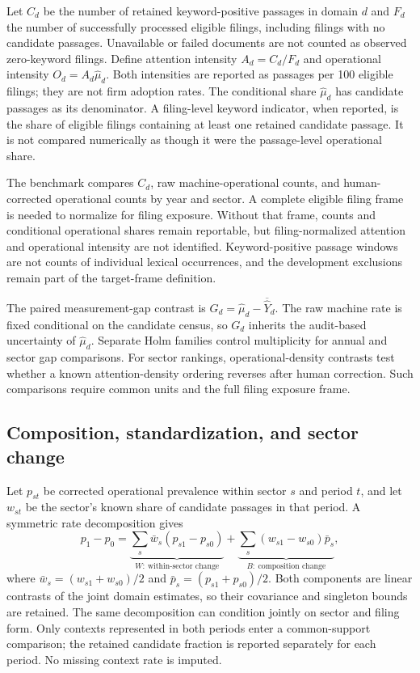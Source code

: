 \documentclass[12pt]{article}
\begin{document}
Let $C_d$ be the number of retained keyword-positive passages in domain $d$
and $F_d$ the number of successfully processed eligible filings, including
filings with no candidate passages. Unavailable or failed documents are not
counted as observed zero-keyword filings. Define attention intensity $A_d=C_d/F_d$ and operational intensity
$O_d=A_d\widehat\mu_d$. Both intensities are reported as passages per 100
eligible filings; they are not firm adoption rates. The conditional share
$\widehat\mu_d$ has candidate passages as its denominator. A filing-level
keyword indicator, when reported, is the share of eligible filings containing
at least one retained candidate passage. It is not compared numerically as
though it were the passage-level operational share.

The benchmark compares $C_d$, raw machine-operational counts, and
human-corrected operational counts by year and sector. A complete eligible
filing frame is needed to normalize for filing exposure. Without that frame,
counts and conditional operational shares remain reportable, but
filing-normalized attention and operational intensity are not identified.
Keyword-positive passage windows are not counts of individual lexical
occurrences, and the development exclusions remain part of the target-frame
definition.

The paired measurement-gap contrast is
$G_d=\widehat\mu_d-\overline{\widehat Y}_d$. The raw machine rate is fixed
conditional on the candidate census, so $G_d$ inherits the audit-based
uncertainty of $\widehat\mu_d$. Separate Holm families control multiplicity
for annual and sector gap comparisons. For sector rankings, operational-density
contrasts test whether a known attention-density ordering reverses after
human correction. Such comparisons require common units and the full filing
exposure frame.

\subsection{Composition, standardization, and sector change}

Let $p_{st}$ be corrected operational prevalence within sector $s$ and period
$t$, and let $w_{st}$ be the sector's known share of candidate passages in that
period. A symmetric rate decomposition \citep{kitagawa1955components} gives
\[
 p_1-p_0
 =\underbrace{\sum_s\bar w_s(p_{s1}-p_{s0})}_{W:\ \text{within-sector change}}
 +\underbrace{\sum_s(w_{s1}-w_{s0})\bar p_s}_{B:\ \text{composition change}},
\]
where $\bar w_s=(w_{s1}+w_{s0})/2$ and
$\bar p_s=(p_{s1}+p_{s0})/2$. Both components are linear contrasts of the
joint domain estimates, so their covariance and singleton bounds are retained.
The same decomposition can condition jointly on sector and filing form.
Only contexts represented in both periods enter a common-support comparison;
the retained candidate fraction is reported separately for each period.
No missing context rate is imputed.
\end{document}
